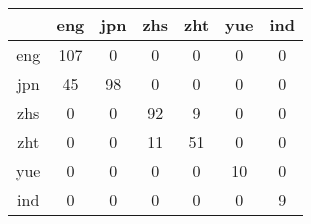 \documentclass{article}
\begin{document}
\centering
\begin{table}[!h]

\begin{tabular}{|c|c|c|c|c|c|c|}
\hline 

& eng & jpn & zhs & zht & yue & ind \\
\hline 
eng & 107 & 0 & 0 & 0 & 0 & 0 \\
\hline 
jpn & 45 & 98 & 0 & 0 & 0 & 0 \\
\hline 
zhs & 0 & 0 & 92 & 9 & 0 & 0 \\
\hline 
zht & 0 & 0 & 11 & 51 & 0 & 0 \\
\hline 
yue & 0 & 0 & 0 & 0 & 10 & 0 \\
\hline 
ind & 0 & 0 & 0 & 0 & 0 & 9 \\
\hline

\end{tabular}
\end{table}
\end{document}
